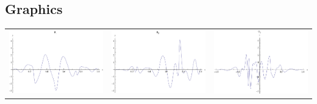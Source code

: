 \documentclass{article}
\begin{document}
\begin{landscape}
\subsection{Graphics}
\begin{tabular}{ccc}
\includegraphics[width=6.7cm]{octic_wavelet_1.pdf}& \includegraphics[width=6.7cm]{octic_wavelet_2.pdf}& \includegraphics[width=6.7cm]{octic_wavelet_3.pdf} \\

\end{tabular}
\end{landscape}
\end{document}
